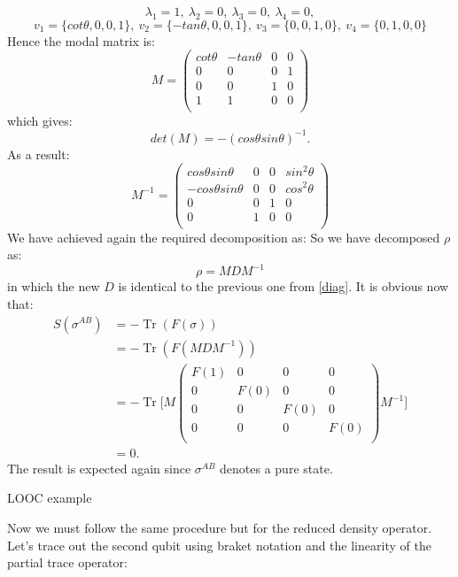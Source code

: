 \begin{equation}
\lambda_1=1,\:  \lambda_2=0,\:  \lambda_3=0,\:  \lambda_4=0, 
\end{equation}
\begin{equation}
v_1=\{cot \theta ,0,0,1\},\:  v_2=\{-tan\theta,0,0,1\},\:  v_3= \{0,0,1,0\},\:  v_4= \{0,1,0,0\}
\end{equation}
Hence the modal matrix is:
\begin{equation}
M=\left(
\begin{array}{cccc}
 cot \theta  & -tan \theta  & 0 & 0 \\
 0 & 0 & 0 & 1 \\
 0 & 0 & 1 & 0 \\
 1 & 1 & 0 & 0 \\
\end{array}
\right)
\end{equation}
which gives:
\begin{equation}
det(M)=-(cos \theta sin \theta )^{-1}.
\end{equation}
As a result:
\begin{equation}
M^{-1}=
\left(
\begin{array}{cccc}
  cos  \theta  sin \theta  & 0 & 0 &  sin ^2 \theta  \\
 - cos   \theta  sin  \theta  & 0 & 0 & cos ^2 \theta  \\
 0 & 0 & 1 & 0 \\
 0 & 1 & 0 & 0 \\
\end{array}
\right)
\end{equation}
We have achieved again the required decomposition as:
So we have decomposed $\rho$ as:
\begin{equation}
\rho=MDM^{-1}
\end{equation}
in which the new $D$ is identical to the previous one from \ref{diag}.
It is obvious now that:
\begin{align}
S(\sigma^{AB}) &= -\operatorname{Tr}(F(\sigma)) \nonumber \\[0.5em]
&= -\operatorname{Tr}(F(MDM^{-1})) \nonumber \\[0.5em]
&=-\operatorname{Tr}\Bigg[
M
\left( \begin{array}{cccc}
 F(1) & 0 & 0 & 0 \\
 0 & F(0) & 0 & 0 \\
 0 & 0 & F(0) & 0 \\
 0 & 0 & 0 & F(0) \\
\end{array}
\right)
M^{-1}
\Bigg]
\nonumber\\[0.5em]
&=0.
\end{align}
The result is expected again since $\sigma^{AB}$ denotes a pure state.
\par
LOOC example
\par 
Now we must follow the same procedure but for the reduced density operator. Let's trace out the second qubit using braket notation and the linearity of the partial trace operator: 

